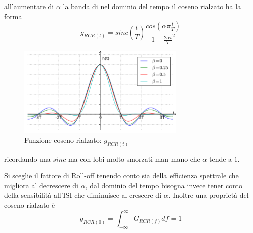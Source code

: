         all'aumentare di $\alpha$ la banda di nel dominio del tempo il coseno rialzato ha la forma
        \[
            g_{RCR(t)} = sinc(\frac{t}{T})\frac{cos(\alpha\pi\frac{t}{T})}{1-\frac{2\alpha t}{T}^2}  
        \]
        \begin{figure}[H]
            \centering
            \includegraphics[width = 8cm]{media/ht-Raised-cosine-impulse.png}
            \caption{Funzione coseno rialzato: $g_{RCR(t)}$}
        \end{figure}
        ricordando una $sinc$ ma con lobi molto smorzati man mano che $\alpha$ tende a $1$. 

        Si sceglie il fattore di Roll-off tenendo conto sia della efficienza spettrale che migliora al decrescere di $\alpha$,
        dal dominio del tempo bisogna invece tener conto della sensibilità all'ISI che diminuisce al crescere di $\alpha$.
        Inoltre una proprietà del coseno rialzato è \label{proprietà coseno rialzato} 
        \[
            g_{RCR(0)} = \int_{-\infty}^{\infty}G_{RCR(f)}df = 1
        \]
